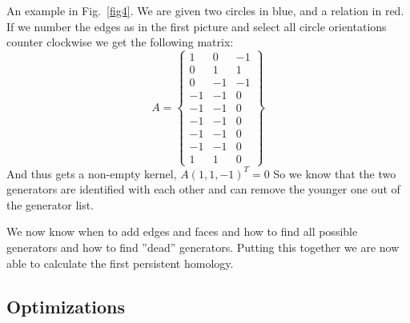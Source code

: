 \documentclass[11pt, a4paper,draft]{report}
\begin{document}
    An example in Fig.~\ref{fig4}.
    We are given two circles in blue, and a relation in red.
    If we number the edges as in the first picture and select all circle orientations counter clockwise we get the following matrix:
    \[A=\begin{Bmatrix}
            1 & 0 & -1\\
            0 & 1 & 1\\
            0 & -1 & -1\\
            -1 & -1 & 0\\
            -1 & -1 & 0\\
            -1 & -1 & 0\\
            -1 & -1 & 0\\
            -1 & -1 & 0\\
            1 & 1 & 0
    \end{Bmatrix}\]
    And thus gets a non-empty kernel, $A(1,1,-1)^T=0$ So we know that the two generators are identified with each other and can remove the younger one out of the generator list.

    We now know when to add edges and faces and how to find all possible generators and how to find ''dead'' generators.
    Putting this together we are now able to calculate the first persistent homology.

    \subsection{Optimizations}\label{subsec:optimizations}
\end{document}
